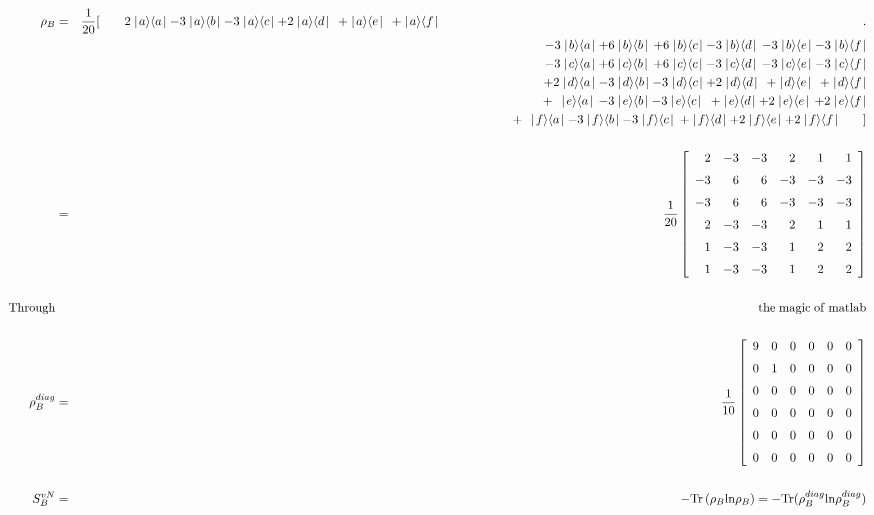 \documentclass[10pt]{article}
\newcommand{\ra}{\rangle}
\newcommand{\la}{\langle}
\newcommand{\kb}[2]{\mid \! #1 \ra \la #2 \!\mid}
\begin{document}
\begin{eqnarray*}
\rho_B &=& \frac{1}{20}[\qquad 2\kb{a}{a} - 3\kb{a}{b} - 3\kb{a}{c} + 2\kb{a}{d} \,\;+\kb{a}{e}\;\, + \kb{a}{f} \qquad\qquad\qquad\qquad\qquad\qquad\qquad\qquad\qquad\qquad 
			\qquad\qquad\qquad\qquad\qquad\qquad\qquad.\\
		&& \qquad  \:\:\:\,- 3\kb{b}{a} +6\kb{b}{b} \,+6\kb{b}{c}-3\kb{b}{d}\, -3\kb{b}{e} -3\kb{b}{f} \\
		&& \qquad  \:\:\:\,- 3\kb{c}{a} +6\kb{c}{b} \,+6\kb{c}{c}-3\kb{c}{d} \,-3\kb{c}{e} -3\kb{c}{f} \\
		&& \qquad  \:\:\:\,+ 2\kb{d}{a} - 3\kb{d}{b} - 3\kb{d}{c} + 2\kb{d}{d} \;\,+\kb{d}{e}\;\, + \kb{d}{f} \\
		&& \qquad  \:\:\:\,+ \;\,\kb{e}{a}\, -3\kb{e}{b} -3\kb{e}{c}\;\:+ \kb{e}{d} + 2\kb{e}{e} \,+ 2\kb{e}{f} \\
		&& \qquad  \:\:\:\,+ \;\,\kb{f}{a} -3\kb{f}{b} -3\kb{f}{c}\:+ \kb{f}{d} + 2\kb{f}{e} + 2\kb{f}{f} \qquad ] \\ \\ 
		&=& \frac{1}{20}\left[
			\begin {array}{rrrrrr}
			2&-3&-3&2&1&1\\
			\noalign{\medskip}
			-3&6&6&-3&-3&-3 \\ \noalign{\medskip}
			-3&6&6&-3&-3&-3 \\ \noalign{\medskip}
			2&-3&-3&2&1&1 \\ \noalign{\medskip}
			1&-3&-3&1&2&2 \\ \noalign{\medskip}
			1&-3&-3&1&2&2
			\end {array}
			\right]\\ \\
			{\rm Through} &&\! \! \! \! \! \!\!\!\!\!\!\!\!\!\!{\rm the\; magic\; of\; matlab} \\ \\
\rho^{diag}_B &=& \frac{1}{10}\left[ \begin {array}{cccccc}
			9&0&0&0&0&0\\
			\noalign{\medskip}
			0&1&0&0&0&0 \\ \noalign{\medskip}
			0&0&0&0&0&0 \\ \noalign{\medskip}
			0&0&0&0&0&0 \\ \noalign{\medskip}
			0&0&0&0&0&0 \\ \noalign{\medskip}
			0&0&0&0&0&0
			\end {array}
			\right] \\ \\
S^{vN}_B &=& - {\rm Tr}\left(\rho_B{\rm ln} \rho_B\right) =   - {\rm Tr}(\rho^{diag}_B{\rm ln} \rho^{diag}_B) \\

\end{eqnarray*}
\end{document}
